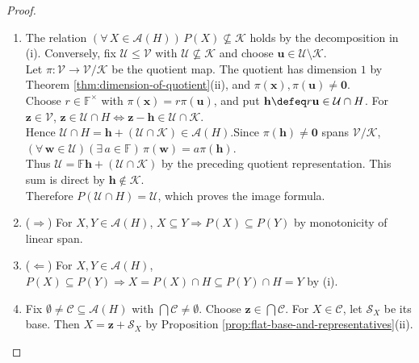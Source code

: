 \begin{theorem}
\begin{proof}
\begin{enumerate}[label=(\roman*)]
If $\mathbf{z}\in P(X)\cap H$, write $\mathbf{z}=a\mathbf{u}+\mathbf{s}$ with $(a,\mathbf{s})\in\mathbb{F}\times\mathcal{S}$. Then $(a-1)\mathbf{u}=(\mathbf{z}-\mathbf{u})-\mathbf{s}\in\mathcal{K}$, so $a=1$ and $\mathbf{z}\in X$.\\
Thus $P(X)\cap H=X$; hence $P$ is injective. For $\mathcal{U}\in\operatorname{im}P$, the same identity is $P^{-1}(\mathcal{U})=\mathcal{U}\cap H$.
\item[$(ii)$] The relation $(\forall\,X\in\mathcal{A}(H))\,P(X)\nsubseteq\mathcal{K}$ holds by the decomposition in (i). Conversely, fix $\mathcal{U}\leq\mathcal{V}$ with $\mathcal{U}\nsubseteq\mathcal{K}$ and choose $\mathbf{u}\in\mathcal{U}\setminus\mathcal{K}$.\\
Let $\pi:\mathcal{V}\to\mathcal{V}/\mathcal{K}$ be the quotient map. The quotient has dimension $1$ by Theorem \ref{thm:dimension-of-quotient}(ii), and $\pi(\mathbf{x}),\pi(\mathbf{u})\neq\mathbf{0}$.\\
Choose $r\in\mathbb{F}^{\times}$ with $\pi(\mathbf{x})=r\pi(\mathbf{u})$, and put $\mathbf{h}\defeq r\mathbf{u}\in\mathcal{U}\cap H$. For $\mathbf{z}\in\mathcal{V}$, $\mathbf{z}\in\mathcal{U}\cap H\iff\mathbf{z}-\mathbf{h}\in\mathcal{U}\cap\mathcal{K}$.\\
Hence $\mathcal{U}\cap H=\mathbf{h}+(\mathcal{U}\cap\mathcal{K})\in\mathcal{A}(H)$.Since $\pi(\mathbf{h})\neq\mathbf{0}$ spans $\mathcal{V}/\mathcal{K}$, $(\forall\,\mathbf{w}\in\mathcal{U})(\exists\,a\in\mathbb{F})\,\pi(\mathbf{w})=a\pi(\mathbf{h})$.\\
Thus $\mathcal{U}=\mathbb{F}\mathbf{h}+(\mathcal{U}\cap\mathcal{K})$ by the preceding quotient representation. This sum is direct by $\mathbf{h}\notin\mathcal{K}$.\\
Therefore $P(\mathcal{U}\cap H)=\mathcal{U}$, which proves the image formula.
\item[$(iii)$] ($\Rightarrow$) For $X,Y\in\mathcal{A}(H)$, $X\subseteq Y\Rightarrow P(X)\subseteq P(Y)$ by monotonicity of linear span.
\item[$(iii)$] ($\Leftarrow$) For $X,Y\in\mathcal{A}(H)$, $P(X)\subseteq P(Y)\Rightarrow X=P(X)\cap H\subseteq P(Y)\cap H=Y$ by (i).
\item[$(iv)$] Fix $\emptyset\neq\mathcal{C}\subseteq\mathcal{A}(H)$ with $\bigcap\mathcal{C}\neq\emptyset$. Choose $\mathbf{z}\in\bigcap\mathcal{C}$. For $X\in\mathcal{C}$, let $\mathcal{S}_X$ be its base. Then $X=\mathbf{z}+\mathcal{S}_X$ by Proposition \ref{prop:flat-base-and-representatives}(ii).\\

\end{enumerate}
\end{proof}
\end{theorem}

